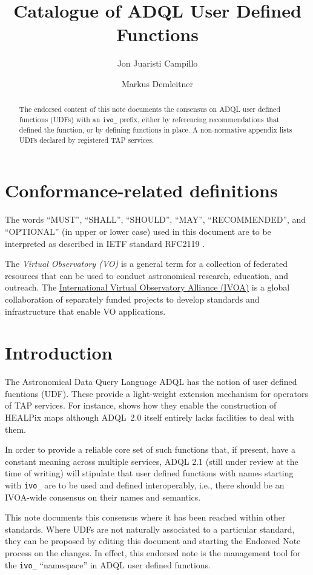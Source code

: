 \documentclass[11pt,a4paper]{ivoa}
\title{Catalogue of ADQL User Defined Functions}
\author[https://wiki.ivoa.net/twiki/bin/view/IVOA/JonJuaristiCampillo]{Jon Juaristi Campillo}
\author[https://wiki.ivoa.net/twiki/bin/view/IVOA/MarkusDemleitner]{Markus Demleitner}
\begin{document}
\begin{abstract}
The endorsed content of this note documents the consensus on ADQL user
defined functions (UDFs) with an \verb|ivo_| prefix, either by
referencing recommendations that defined the function, or by defining
functions in place.  A non-normative appendix lists UDFs declared by
registered TAP services.
\end{abstract}


\section*{Conformance-related definitions}

The words ``MUST'', ``SHALL'', ``SHOULD'', ``MAY'', ``RECOMMENDED'', and
``OPTIONAL'' (in upper or lower case) used in this document are to be
interpreted as described in IETF standard RFC2119 \citep{std:RFC2119}.

The \emph{Virtual Observatory (VO)} is a
general term for a collection of federated resources that can be used
to conduct astronomical research, education, and outreach.
The \href{http://www.ivoa.net}{International
Virtual Observatory Alliance (IVOA)} is a global
collaboration of separately funded projects to develop standards and
infrastructure that enable VO applications.


\section{Introduction}

The Astronomical Data Query Language ADQL \citep{2008ivoa.spec.1030O}
has the notion of user defined fucntions (UDF).  These provide a
light-weight extension mechanism for operators of TAP services.  
For instance, \citet{2016arXiv161109190T} shows how they enable the
construction of HEALPix maps although ADQL~2.0 itself entirely lacks
facilities to deal with them.

In order to provide a reliable core set of such functions that, if
present, have a constant meaning across multiple services, ADQL 2.1
(still under review at the time of writing) will stipulate that user
defined functions with names starting with \verb|ivo_| are to be used
and defined interoperably, i.e., there should be an IVOA-wide consensus
on their names and semantics. 

This note documents this consensus where it has been reached within
other standards.  Where UDFs are not naturally associated to a
particular standard, they can be proposed by editing this document and
starting the Endorsed Note process \citep{2017ivoa.spec.0517G} on the
changes.  In effect, this endorsed note is the management tool for
the \verb|ivo_| ``namespace'' in ADQL user defined functions.
\end{document}
